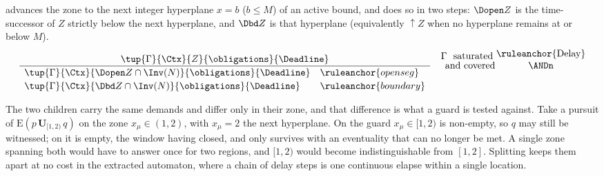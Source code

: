  advances the zone to the next integer hyperplane $x=b$ ($b\le M$) of an active bound,
and does so in two steps: $\Dopen Z$ is the time-successor of $Z$ strictly below the next
hyperplane, and $\Dbd Z$ is that hyperplane (equivalently $\uparrow\!Z$ when no hyperplane remains at or
below $M$). %
\vspace{-0.2cm}
\[
 \frac{\tup{\Gamma}{\Ctx}{Z}{\obligations}{\Deadline}}
{\begin{array}{ll}
\tup{\Gamma}{\Ctx}{\Dopen Z\cap\Inv(N)}{\obligations}{\Deadline} & \ruleanchor{openseg}\\[2pt]
\tup{\Gamma}{\Ctx}{\Dbd Z\cap\Inv(N)}{\obligations}{\Deadline} & \ruleanchor{boundary}
\end{array}}
\quad  \shortstack{$\Gamma$ \text{ saturated }\\ \text { and covered}}
\shortstack{\ruleanchor{Delay}\\ \ANDn }
\]

The two children carry the same demands and differ only in their zone, and that difference is
what a guard is tested against. Take a pursuit of $\mathrm{E}(p\,\mathbf{U}_{[1,2)}\,q)$ on the
zone $x_\mu\in(1,2)$, with $x_\mu=2$ the next hyperplane. On  the
 guard $x_\mu\in[1,2)$ is non-empty, so $q$ may still be witnessed; on  it is empty, the window having closed, and only  survives with an
eventuality that can no longer be met. A single zone spanning both would have to answer once
for two regions, and $[1,2)$ would become indistinguishable from $[1,2]$. Splitting keeps them
apart at no cost in the extracted automaton, where a chain of delay steps is one continuous
elapse within a single location.


